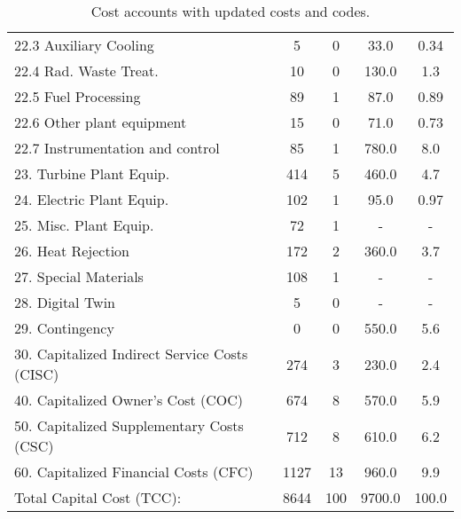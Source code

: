 \begin{table}[h!]
{\begin{tabular}{lcccc}
\hspace{10mm}22.3 Auxiliary Cooling & 5 & 0 & 33.0 & 0.34 \\
\hspace{10mm}22.4 Rad. Waste Treat. & 10 & 0 & 130.0 & 1.3 \\
\hspace{10mm}22.5 Fuel Processing & 89 & 1 & 87.0 & 0.89 \\
\hspace{10mm}22.6 Other plant equipment & 15 & 0 & 71.0 & 0.73 \\
\hspace{10mm}22.7 Instrumentation and control & 85 & 1 & 780.0 & 8.0 \\
\hspace{5mm}23. Turbine Plant Equip. & 414 & 5 & 460.0 & 4.7 \\
\hspace{5mm}24. Electric Plant Equip. & 102 & 1 & 95.0 & 0.97 \\
\hspace{5mm}25. Misc. Plant Equip. & 72 & 1 & - & - \\
\hspace{5mm}26. Heat Rejection & 172 & 2 & 360.0 & 3.7 \\
\hspace{5mm}27. Special Materials & 108 & 1 & - & - \\
\hspace{5mm}28. Digital Twin & 5 & 0 & - & - \\
\hspace{5mm}29. Contingency & 0 & 0 & 550.0 & 5.6 \\
30. Capitalized Indirect Service Costs (CISC) & 274 & 3 & 230.0 & 2.4 \\
40. Capitalized Owner’s Cost (COC) & 674 & 8 & 570.0 & 5.9 \\
50. Capitalized Supplementary Costs (CSC) & 712 & 8 & 610.0 & 6.2 \\
60. Capitalized Financial Costs (CFC) & 1127 & 13 & 960.0 & 9.9 \\
\hline
Total Capital Cost (TCC): & 8644 & 100 & 9700.0 & 100.0 \\
\hline
\end{tabular}
}
\caption{Cost accounts with updated costs and codes. }
\label{tab:costsupdatedcodes}
\end{table}


